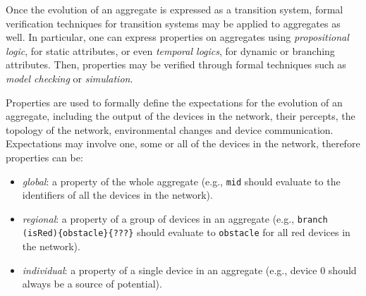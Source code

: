 Once the evolution of an aggregate is expressed as a transition system, formal
verification techniques for transition systems may be applied to aggregates as
well. In particular, one can express properties on aggregates using
\textit{propositional logic}, for static attributes, or even \textit{temporal
logics}, for dynamic or branching attributes. Then, properties may be verified
through formal techniques such as \textit{model checking} or
\textit{simulation}.

Properties are used to formally define the expectations for the evolution of an
aggregate, including the output of the devices in the network, their percepts,
the topology of the network, environmental changes and device communication.
Expectations may involve one, some or all of the devices in the network,
therefore properties can be:
\begin{itemize}
  \item \textit{global}: a property of the whole aggregate (e.g., \texttt{mid}
        should evaluate to the identifiers of all the devices in the network).
  \item \textit{regional}: a property of a group of devices in an aggregate
        (e.g., \texttt{branch (isRed)\{obstacle\}\{???\}} should evaluate to
        \texttt{obstacle} for all red devices in the network).
  \item \textit{individual}: a property of a single device in an aggregate
        (e.g., device 0 should always be a source of potential).
\end{itemize}
